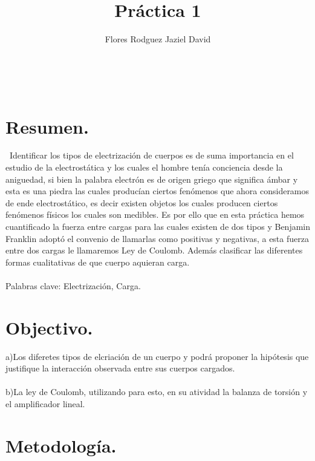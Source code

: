 \documentclass[11pt,a4paper]{article}
\author{Flores Rodguez Jaziel David }
\title{Práctica 1}
\begin{document}
\tableofcontents
\\
\medskip
\medskip
\section{Resumen.}
\
Identificar los tipos de electrizaci\'{o}n de cuerpos es de suma importancia en el estudio de la electrost\'{a}tica y los cuales el hombre ten\'{i}a conciencia desde la aniguedad, si bien la palabra electr\'{o}n es de origen griego que significa \'{a}mbar y esta es una piedra las cuales produc\'{i}an ciertos fen\'{o}menos que ahora consideramos de ende electrost\'{a}tico, es decir existen objetos los cuales producen ciertos fen\'{o}menos f\'{i}sicos los cuales son medibles. Es por ello que en esta pr\'{a}ctica hemos cuantificado la fuerza entre cargas para las cuales existen de dos tipos y Benjamin Franklin adopt\'{o} el convenio de llamarlas como positivas y negativas, a esta fuerza entre dos cargas le llamaremos Ley de Coulomb. Adem\'{a}s clasificar las diferentes formas cualitativas de que cuerpo aquieran carga.
\\
\\
\medskip
Palabras clave: Electrizaci\'{o}n, Carga.


\section{Objectivo.}
a)Los diferetes tipos de elcriaci\'{o}n de un cuerpo y podr\'{a} proponer la hip\'{o}tesis que justifique la interacci\'{o}n observada entre sus cuerpos cargados.
\\
\\
b)La ley de Coulomb, utilizando para esto, en su atividad la balanza de torsi\'{o}n y el amplificador lineal.

\pagebreak


\section{Metodolog\'{i}a.}
\end{document}
